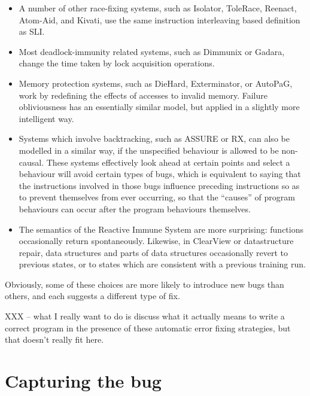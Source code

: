 \documentclass[10pt,a4paper,twocolumn]{article}
\begin{document}
\begin{itemize}
\item A number of other race-fixing systems, such as
  Isolator\cite{Ramalingam2009}, ToleRace\cite{Kirovski2007},
  Reenact\cite{Prvulovic2003a}, Atom-Aid\cite{Lucia2009}, and
  Kivati\cite{Chew2010a}, use the same instruction interleaving based
  definition as SLI.
\item Most deadlock-immunity related systems, such as
  Dimmunix\cite{Jula2008} or Gadara\cite{Wang2008}, change the time
  taken by lock acquisition operations.
\item Memory protection systems, such as DieHard\cite{Berger2006},
  Exterminator\cite{Novark2007}, or AutoPaG\cite{Lin2007}, work by
  redefining the effects of accesses to invalid memory.  Failure
  obliviousness\cite{Rinard2004} has an essentially similar model, but
  applied in a slightly more intelligent way.
\item Systems which involve backtracking, such as
  ASSURE\cite{Sidiroglou2009} or RX\cite{Qin2007}, can also be
  modelled in a similar way, if the unspecified behaviour is allowed
  to be non-causal.  These systems effectively look ahead at certain
  points and select a behaviour will avoid certain types of bugs,
  which is equivalent to saying that the instructions involved in
  those bugs influence preceding instructions so as to prevent
  themselves from ever occurring, so that the ``causes'' of program
  behaviours can occur after the program behaviours
  themselves.
\item The semantics of the Reactive Immune System\cite{Sidiroglou2005}
  are more surprising: functions occasionally return spontaneously.
  Likewise, in ClearView\cite{Perkins} or datastructure
  repair\cite{Elkarablieh2007}, data structures and parts of data
  structures occasionally revert to previous states, or to states
  which are consistent with a previous training run.
\end{itemize}

Obviously, some of these choices are more likely to introduce new bugs
than others, and each suggests a different type of fix.

XXX -- what I really want to do is discuss what it actually means to
write a correct program in the presence of these automatic error
fixing strategies, but that doesn't really fit here.

\section{Capturing the bug}
\end{document}
